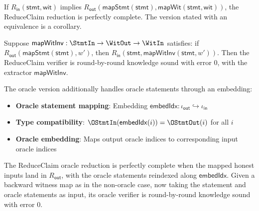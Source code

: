 \begin{theorem}
    If $R_{\mathsf{in}}(\mathsf{stmt}, \mathsf{wit})$ implies $R_{\mathsf{out}}(\mathsf{mapStmt}(\mathsf{stmt}), \mathsf{mapWit}(\mathsf{stmt}, \mathsf{wit}))$, the ReduceClaim reduction is perfectly complete. The version stated with an equivalence is a corollary.
    \leanok
\end{theorem}

\begin{theorem}
    Suppose $\mathsf{mapWitInv} : \StmtIn \to \WitOut \to \WitIn$ satisfies: if $R_{\mathsf{out}}(\mathsf{mapStmt}(\mathsf{stmt}), w')$, then $R_{\mathsf{in}}(\mathsf{stmt}, \mathsf{mapWitInv}(\mathsf{stmt}, w'))$. Then the ReduceClaim verifier is round-by-round knowledge sound with error $0$, with the extractor $\mathsf{mapWitInv}$.
    \leanok
\end{theorem}

\begin{definition}
    \label{def:reduceclaim_oracle_reduction}
    The oracle version additionally handles oracle statements through an embedding:
    \begin{itemize}
        \item \textbf{Oracle statement mapping}: Embedding $\mathsf{embedIdx} : \iota_{\mathsf{out}} \hookrightarrow \iota_{\mathsf{in}}$
        \item \textbf{Type compatibility}: $\OStmtIn(\mathsf{embedIdx}(i)) = \OStmtOut(i)$ for all $i$
        \item \textbf{Oracle embedding}: Maps output oracle indices to corresponding input oracle indices
    \end{itemize}
    \leanok
\end{definition}

\begin{theorem}
    The ReduceClaim oracle reduction is perfectly complete when the mapped honest inputs land in $R_{\mathsf{out}}$, with the oracle statements reindexed along $\mathsf{embedIdx}$. Given a backward witness map as in the non-oracle case, now taking the statement and oracle statements as input, its oracle verifier is round-by-round knowledge sound with error $0$.
    \leanok
\end{theorem}

